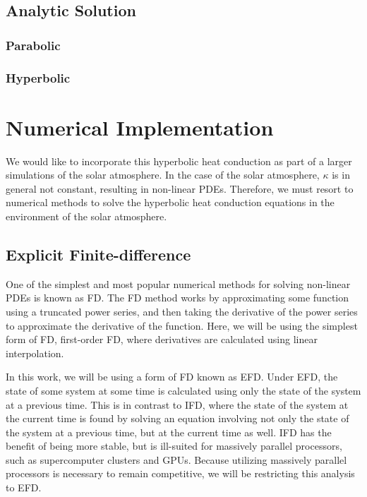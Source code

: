 \documentclass[iop]{emulateapj}
\begin{document}
			
		\subsection{Analytic Solution}
			\subsubsection{Parabolic}
			\subsubsection{Hyperbolic}
	\section{Numerical Implementation}
	
		We would like to incorporate this hyperbolic heat conduction as part of a larger simulations of the solar atmosphere.
			In the case of the solar atmosphere, $\kappa$ is in general not constant, resulting in non-linear \acp{PDE}.
			Therefore, we must resort to numerical methods to solve the hyperbolic heat conduction equations in the environment of the solar atmosphere.
	
		\subsection{Explicit Finite-difference}
		
			One of the simplest and most popular numerical methods for solving non-linear \acp{PDE} is known as \ac{FD}.
				The \ac{FD} method works by approximating some function using a truncated power series, and then taking the derivative of the power series to approximate the derivative of the function.
				Here, we will be using the simplest form of \ac{FD}, first-order \ac{FD}, where derivatives are calculated using linear interpolation.
				
			In this work, we will be using a form of \ac{FD} known as \ac{EFD}. 
				Under \ac{EFD}, the state of some system at some time is calculated using only the state of the system at a previous time. 
				This is in contrast to \ac{IFD}, where the state of the system at the current time is found by solving an equation involving not only the state of the system at a previous time, but at the current time as well.
				\ac{IFD} has the benefit of being more stable, but is ill-suited for massively parallel processors, such as supercomputer clusters and \acp{GPU}.
				Because utilizing massively parallel processors is necessary to remain competitive, we will be restricting this analysis to \ac{EFD}.
				
\end{document}
